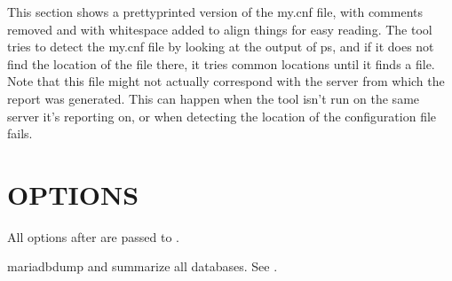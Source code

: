 \documentclass[letterpaper,10pt,english]{sphinxmanual}
\begin{document}
\sphinxAtStartPar
This section shows a pretty\sphinxhyphen{}printed version of the my.cnf file, with comments
removed and with whitespace added to align things for easy reading. The tool
tries to detect the my.cnf file by looking at the output of ps, and if it does
not find the location of the file there, it tries common locations until it
finds a file. Note that this file might not actually correspond with the server
from which the report was generated. This can happen when the tool isn’t run on
the same server it’s reporting on, or when detecting the location of the
configuration file fails.


\section{OPTIONS}
\label{\detokenize{mariadb-database-summary:options}}
\sphinxAtStartPar
All options after \textendash{} are passed to .

\begin{fulllineitems}
\label{\detokenize{mariadb-database-summary:cmdoption-mariadb-database-summary-all-databases}}
\sphinxAtStartPar
mariadb\sphinxhyphen{}dump and summarize all databases.  See {\hyperref[\detokenize{mariadb-database-summary:cmdoption-mariadb-database-summary-databases}]{}}.

\end{fulllineitems}

\end{document}

